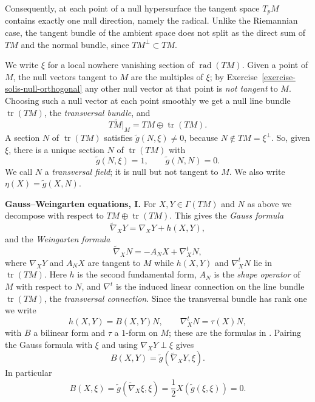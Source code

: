 \noindent
Consequently, at each point of a null
hypersurface the tangent space $T_pM$
contains exactly one null direction,
namely the radical. Unlike the Riemannian
case, the tangent bundle of the ambient
space does not split as the direct sum of
$TM$ and the normal bundle, since
$TM^{\perp}\subset TM$.

We write $\xi$ for a local nowhere
vanishing section of
$\operatorname{rad}(TM)$. Given a point of
$M$, the null vectors tangent to $M$ are
the multiples of $\xi$; by
Exercise~\ref{exercise-solis-null-orthogonal}
any other null vector at that point is
\emph{not tangent} to $M$. Choosing such a
null vector at each point smoothly we get
a null line bundle
$\operatorname{tr}(TM)$, the
\emph{transversal bundle}, and
$$
T\widetilde{M}|_M
=TM\oplus\operatorname{tr}(TM).
$$
A section $N$ of $\operatorname{tr}(TM)$
satisfies $\widetilde{g}(N,\xi)\neq 0$,
because $N\notin TM=\xi^{\perp}$. So,
given $\xi$, there is a unique section $N$
of $\operatorname{tr}(TM)$ with
$$
\widetilde{g}(N,\xi)=1,\qquad
\widetilde{g}(N,N)=0.
$$
We call $N$ a \emph{transversal field};
it is null but not tangent to $M$. We also
write $\eta(X)=\widetilde{g}(X,N)$.

\medskip\noindent
{\bf Gauss--Weingarten equations, I.}
For $X,Y\in\Gamma(TM)$ and $N$ as above we
decompose with respect to
$TM\oplus\operatorname{tr}(TM)$. This gives
the \emph{Gauss formula}
$$
\widetilde{\nabla}_XY
=\nabla_XY+h(X,Y),
$$
and the \emph{Weingarten formula}
$$
\widetilde{\nabla}_XN
=-A_NX+\nabla^t_XN,
$$
where $\nabla_XY$ and $A_NX$ are tangent
to $M$ while $h(X,Y)$ and $\nabla^t_XN$ lie
in $\operatorname{tr}(TM)$. Here $h$ is the
second fundamental form, $A_N$ is the
\emph{shape operator} of $M$ with respect
to $N$, and $\nabla^t$ is the induced
linear connection on the line bundle
$\operatorname{tr}(TM)$, the
\emph{transversal connection}. Since the
transversal bundle has rank one we write
$$
h(X,Y)=B(X,Y)N,\qquad
\nabla^t_XN=\tau(X)N,
$$
with $B$ a bilinear form and $\tau$ a
$1$-form on $M$; these are the formulas
in \cite[Section 2]{navarro2020screen}.
Pairing the Gauss formula with $\xi$ and
using $\nabla_XY\perp\xi$ gives
\begin{equation}
\label{equation-solis-b-formula}
B(X,Y)=\widetilde{g}(
\widetilde{\nabla}_XY,\xi).
\end{equation}
In particular
\begin{equation}
\label{equation-solis-b-xi}
B(X,\xi)=\widetilde{g}(
\widetilde{\nabla}_X\xi,\xi)
=\frac{1}{2}X\left(
\widetilde{g}(\xi,\xi)\right)=0.
\end{equation}

